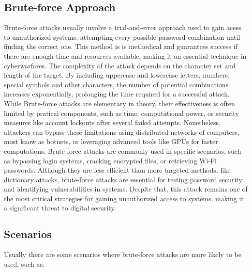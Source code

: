 \documentclass{comjnl}
\begin{document}
\subsection{Brute-force Approach}
Brute-force attacks usually involve a trial-and-error approach used to gain acess to unauthorized systems, attempting every possible password combination until finding the correct one. This method is  is methodical and guarantees success if there are enough time and resources available, making it an essential technique in cyberwarfares. The complexity of the attack depends on the character set and length of the target. By including uppercase and lowercase letters, numbers, special symbols and other characters, the number of potential combinations increases exponentially, prolonging the time required for a successful attack.  While Brute-force attacks are elementary in theory, their effectiveness is often limited by pratical components, such as time, computational power, or security measures like account lockouts after several failed attempts. Nonetheless, attackers can bypass these limitations using distributed networks of computers, most know as botnets, or leveraging advanced tools like GPUs for faster computations. Brute-force attacks are commonly used in specific scenarios, such as bypassing login systems, cracking encrypted files, or retrieving Wi-Fi passwords. Although they are less efficient than more targeted methods, like dictionary attacks, brute-force attacks are essential for testing password security and identifying vulnerabilities in systems. Despite that, this attack remains one of the most critical strategies for gaining unauthorized access to systems, making it a significant threat to digital security.

\subsection*{Scenarios}
Usually there are some scenarios where brute-force attacks are more likely to be used, such as:
\end{document}
